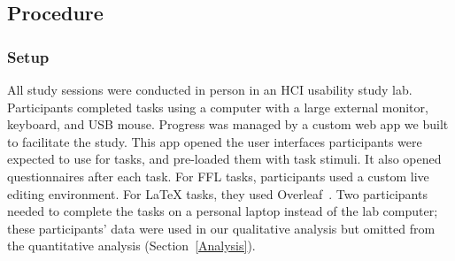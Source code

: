 

\subsection{Procedure}

\subsubsection{Setup}
All study sessions were conducted in person in an HCI usability study lab. Participants completed tasks using a computer with a large external monitor, keyboard, and USB mouse. Progress was managed by a custom web app we built to facilitate the study. This app opened the user interfaces participants were expected to use for tasks, and pre-loaded them with task stimuli. It also opened questionnaires after each task. For FFL tasks, participants used a custom live editing environment. For LaTeX tasks, they used Overleaf~\cite{tool:overleaf}. Two participants needed to complete the tasks on a personal laptop instead of the lab computer; these participants' data were used in our qualitative analysis but omitted from the quantitative analysis (Section~\ref{Analysis}).


